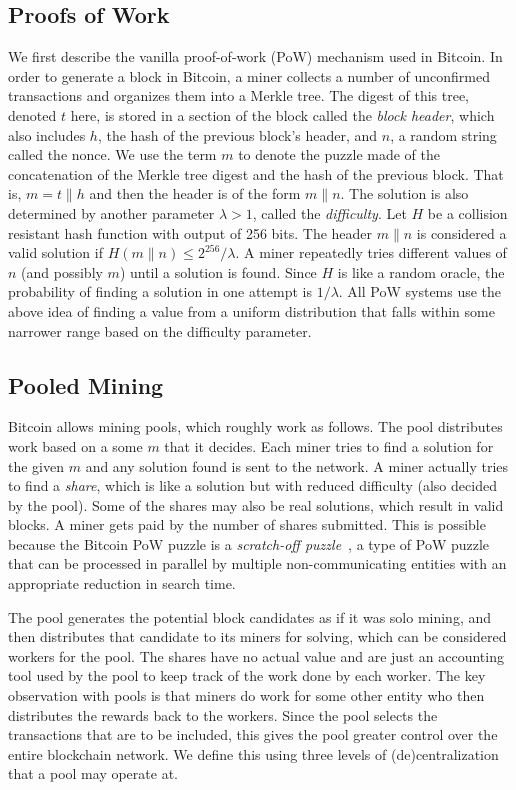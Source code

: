 \documentclass{llncs}
\begin{document}
\subsection{Proofs of Work} 

We first describe the vanilla proof-of-work (PoW) mechanism used in Bitcoin. In order to generate a block in Bitcoin, a miner collects a number of unconfirmed transactions and organizes them into a Merkle tree.
The digest of this tree, denoted $t$ here, is stored in a section of the block called the {\em block header}, which also includes $h$, the hash of the previous block's header, and $n$, a random string called the nonce. We use the term $m$ to denote the puzzle made of the concatenation of the Merkle tree digest and the hash of the previous block. That is, $m = t\|h$ and
then the header is of the form $m\|n$.
The solution is also determined by another parameter $\lambda > 1$, called the {\em difficulty}. Let $H$ be a collision
resistant hash function with output of 256 bits. 
The header $m\|n$ is considered a valid solution
if $H(m\|n) \leq 2^{256}/\lambda$.
A miner repeatedly tries different values of $n$ (and possibly $m$) until a solution is found. 
Since $H$ is like a random oracle, the probability of finding a solution in one attempt is 
$1 / \lambda$.
All PoW systems use the above idea of finding a value from a uniform distribution that falls within some narrower range based on the difficulty parameter. 

\subsection{Pooled Mining} 
\label{pool-levels}
Bitcoin allows mining pools, which roughly work as follows. The pool distributes work based on a some $m$ that it decides. Each miner tries to find a solution for the given $m$ and any solution found is sent to the network.
A miner actually tries to find a {\em share}, which is like a solution but with reduced difficulty (also decided by the pool). Some of the shares may also be real solutions, which result in valid blocks. A miner gets paid by the number of shares submitted. This is possible because the Bitcoin PoW puzzle is a {\em scratch-off puzzle}~\cite{miller2015nonoutsourceable}, a type of PoW puzzle that can be processed in parallel by multiple non-communicating entities with an appropriate reduction in search time.

The pool generates the potential block candidates as if it was solo mining, and then distributes that candidate to its miners for solving, which can be considered workers for the pool. The shares have no actual value and are just an accounting tool used by the pool to keep track of the work done by each worker. The key observation with pools is that miners do work for some other entity who then distributes the rewards back to the workers.
Since the pool selects the transactions that are to be included, this gives the pool greater control over the entire blockchain network. We define this using three levels of (de)centralization that a pool may operate at. 
\end{document}
